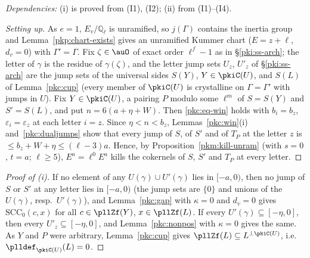 \documentclass[10pt]{amsart}
\theoremstyle{definition}
\theoremstyle{remark}
\newcommand{\Q}{\mathbb Q}
\begin{document}
\emph{Dependencies:} (i) is proved from (I1), (I2); (ii) from (I1)--(I4).

\begin{proof}[Setting up]
As $e=1$, $E_v/\Q_\ell$ is unramified, so $j(\Gamma)$ contains the inertia group and
Lemma~\ref{pkp:chart-exists} gives an unramified Kummer chart ($E=z+\ell$, $d_v=0$) with $\Gamma'=
\Gamma$. Fix $\zeta\in\auO$ of exact order $\ell^f-1$ as in \S\ref{pki:ss-arch}; the letter of $\gamma$
is the residue of $\gamma(\zeta)$, and the letter jump sets $U_z$, $U'_z$ of \S\ref{pki:ss-arch} are the
jump sets of the universal sides $S(Y)$, $Y\in\pkiC(U)$, and $S(L)$ of Lemma~\ref{pkc:cup} (every
member of $\pkiC(U)$ is crystalline on $\Gamma=\Gamma'$ with jumps in $U$). Fix $Y\in\pkiC(U)$, a
pairing $P$ modulo some $\ell^m$ of $S=S(Y)$ and $S'=S(L)$, and put $n=6(a+\eta+W)$. Then
\eqref{pkc:eq-win} holds with $b_i=b_z$, $\varepsilon_i=\varepsilon_z$ at each letter $i=z$. Since
$\eta<n<b_z$, Lemmas~\ref{pkc:win}(i) and~\ref{pkc:dualjumps} show that every jump of $S$, of $S'$ and
of $T_P$ at the letter $z$ is $\le b_z+W+\eta\le(\ell-3)a$. Hence, by Proposition~\ref{pkm:kill-unram}
(with $s=0$, $t=a$; $\ell\ge5$), $E^a=\ell^0E^a$ kills the cokernels of $S$, $S'$ and $T_P$ at every
letter.
\end{proof}

\begin{proof}[Proof of (i)]
If no element of any $U(\gamma)\cup U'(\gamma)$ lies in $[-a,0)$, then no jump of $S$ or $S'$ at any
letter lies in $[-a,0)$ (the jump sets are $\{0\}$ and unions of the $U(\gamma)$, resp.\
$U'(\gamma)$), and Lemma~\ref{pkc:gap} with $\kappa=0$ and $d_v=0$ gives $\mathrm{SCC}_0(c,x)$ for all
$c\in\pllZf(Y)$, $x\in\pllZf(L)$. If every $U'(\gamma)\subseteq[-\eta,0]$, then every
$U'_z\subseteq[-\eta,0]$, and Lemma~\ref{pkc:nonpos} with $\kappa=0$ gives the same. As $Y$ and $P$ were
arbitrary, Lemma~\ref{pkc:cup} gives $\pllZf(L)\subseteq L^{\perp\pkiC(U)}$, i.e.\
$\plldef_{\pkiC(U)}(L)=0$.
\end{proof}
\end{document}
